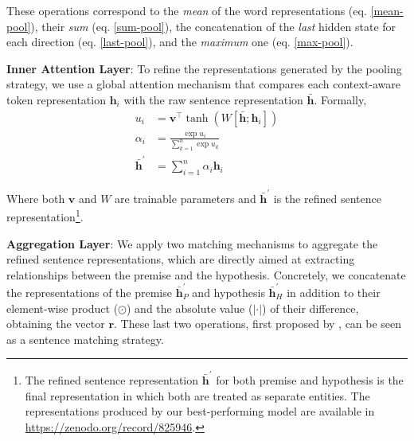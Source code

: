 \documentclass[11pt,letterpaper]{article}
\begin{document}
\noindent These operations correspond to the \emph{mean} of the word representations (eq. \ref{mean-pool}), their \emph{sum} (eq. \ref{sum-pool}), the concatenation of the \emph{last} hidden state for each direction (eq. \ref{last-pool}), and the \emph{maximum} one (eq. \ref{max-pool}).

\textbf{Inner Attention Layer}: To refine the representations generated by the pooling strategy, we use a global attention mechanism \cite{luong_effective_2015, vinyals_grammar_2015} that compares each context-aware token representation $\bm{h}_i$ with the raw sentence representation $\bar{\bm{h}}$. Formally,
\begin{align}
	\label{att-scoring}u_i &= \bm{v}^{\top} \tanh(W [\bar{\bm{h}}; \bm{h}_i])\\
	\alpha_i &= \frac{\exp{u_i}}{\sum_{k=1}^{n}{\exp{u_k}}} \\
	\bar{\bm{h}}^{\prime} &= \sum_{i=1}^n \alpha_i \bm{h}_i
\end{align}

\noindent Where both $\bm{v}$ and $W$ are trainable parameters and $\bar{\bm{h}}^{\prime}$ is the refined sentence representation\footnote{The refined sentence representation $\bar{\bm{h}}^{\prime}$ for both premise and hypothesis is the final representation in which both are treated as separate entities. The representations produced by our best-performing model are available in \url{https://zenodo.org/record/825946}.}.



\textbf{Aggregation Layer}: We apply two matching mechanisms to aggregate the refined sentence representations, which are directly aimed at extracting relationships between the premise and the hypothesis. Concretely, we concatenate the representations of the premise $\bar{\bm{h}}_P^{\prime}$ and hypothesis $\bar{\bm{h}}_H^{\prime}$ in addition to their element-wise product ($\odot$) and the absolute value ($ | \cdot | $) of their difference, obtaining the vector $\bm{r}$. These last two operations, first proposed by , can be seen as a sentence matching strategy.
\end{document}
